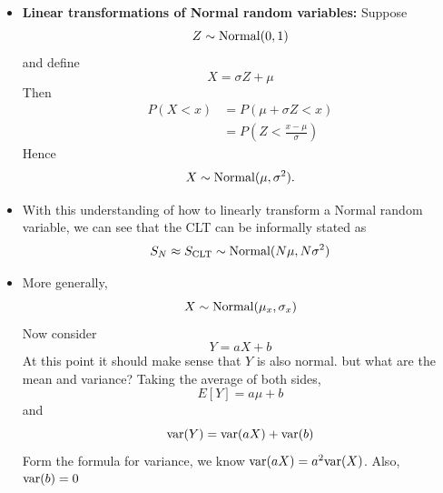 \begin{itemize}

\item {\bf Linear transformations of Normal random variables:}  Suppose 
\begin{equation*}
Z \sim {\rm Normal}(0,1)
\end{equation*}
and define 
\begin{equation*}
X = \sigma Z + \mu 
\end{equation*}
Then 
\begin{align*}
P(X<x) &= P(\mu + \sigma Z<x) \\
&= P\left(Z<\frac{x - \mu}{\sigma}\right)
\end{align*}
Hence 
\begin{equation*}
X \sim {\rm Normal}(\mu,\sigma^2).
\end{equation*} 
\item With this understanding of how to linearly transform a Normal random variable, we can see that the CLT can be informally stated as
\begin{equation*}
S_N \approx S_{\rm CLT} \sim {\rm Normal}(N\mu,N\sigma^2)
\end{equation*}
\item More generally, 
\begin{equation*}
X \sim {\rm Normal}(\mu_x,\sigma_x)
\end{equation*}
Now consider 
\begin{equation*}\label{eq:linear}
Y = aX + b 
\end{equation*}
At this point it should make sense that $Y$ is also normal. 
 but what are the mean and variance? Taking the average of both sides, 
\begin{equation*}
E[Y] = a\mu + b
\end{equation*}
and 
\begin{equation*}
{\rm var}(Y) = {\rm var}(aX) + {\rm var}(b)
\end{equation*}
Form the formula for variance, we know ${\rm var}(aX)  = a^2{\rm var}(X)$. Also, ${\rm var}(b) =0$

\end{itemize}
